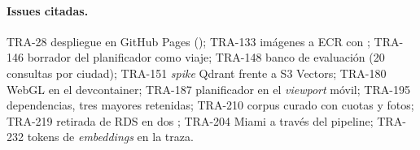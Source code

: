 {\paragraph{Issues citadas.}
TRA-28 despliegue en GitHub Pages ();
TRA-133 imágenes a ECR con ;
TRA-146 borrador del planificador como viaje;
TRA-148 banco de evaluación (20 consultas por ciudad);
TRA-151 \emph{spike} Qdrant frente a S3 Vectors;
TRA-180 WebGL en el devcontainer;
TRA-187 planificador en el \emph{viewport} móvil;
TRA-195 dependencias, tres mayores retenidas;
TRA-210 corpus curado con cuotas y fotos;
TRA-219 retirada de RDS en dos ;
TRA-204 Miami a través del pipeline; TRA-232 tokens de \emph{embeddings} en la traza.
\par}
